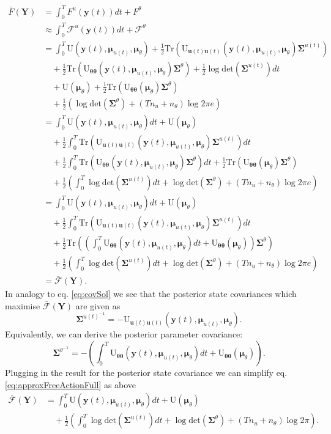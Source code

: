 \documentclass[a4paper,10pt]{article}
\newcommand{\bs}[1]{\mathbf{#1}}					%
\newcommand{\bgs}[1]{\boldsymbol{#1}}				%
\newcommand{\eq}[1]{\begin{equation} #1 \end{equation}}%
\newcommand{\trace}[1]{\mathrm{Tr}\left(#1\right)}					%
\renewcommand{\ss}{u}         %
\newcommand{\so}{y}         %
\renewcommand{\sp}{\theta}    %
\newcommand{\ps}{\bs{\ss}}    %
\newcommand{\po}{\bs{\so}}    %
\newcommand{\pp}{\bgs{\sp}} %
\newcommand{\Po}{\bs{Y}}    %
\newcommand{\U}{\mathrm{U}}			%
\newcommand{\F}{\mathcal{F}}				%
\newcommand{\Fa}{\bar{\mathcal{F}}}		%
\newcommand{\Cov}{\bgs{\Sigma}}			%
\renewcommand{\det}[1]{\mathrm{det}(#1)}	%
\begin{document}
\begin{align}
    \bar{F}(\Po) &= \int_0^T F^\ss(\po(t)) dt + F^\sp\\
    &\approx \int_0^T \F^\ss(\po(t)) dt + \F^\sp\\
    &= \int_0^T  \U(\po(t),\bgs{\mu}_{\ss(t)},\bgs{\mu}_\sp) + \frac{1}{2}\trace{\U_{\ps(t)\ps(t)}(\po(t),\bgs{\mu}_{\ss(t)},\bgs{\mu}_\sp)\Cov^{\ss(t)}}\nonumber\\
    &\quad + \frac{1}{2}\trace{\U_{\pp\pp}(\po(t),\bgs{\mu}_{\ss(t)},\bgs{\mu}_\sp)\Cov^\sp} + \frac{1}{2}\log \det{\Cov^{\ss(t)}} dt \nonumber\\ 
    &\quad + \U(\bgs{\mu}_\sp) + \frac{1}{2}\trace{\U_{\pp\pp}(\bgs{\mu}_\sp)\Cov^\sp}\nonumber\\
    &\quad + \frac{1}{2} \left(\log \det{\Cov^\sp} + (Tn_\ss + n_{\sp}) \log 2\pi e\right)\\
    &= \int_0^T  \U(\po(t),\bgs{\mu}_{\ss(t)},\bgs{\mu}_\sp)dt + \U(\bgs{\mu}_\sp) \nonumber\\
    &\quad + \frac{1}{2}\int_0^T \trace{\U_{\ps(t)\ps(t)}(\po(t),\bgs{\mu}_{\ss(t)},\bgs{\mu}_\sp)\Cov^{\ss(t)}}dt\nonumber\\
    &\quad + \frac{1}{2}\int_0^T \trace{\U_{\pp\pp}(\po(t),\bgs{\mu}_{\ss(t)},\bgs{\mu}_\sp)\Cov^\sp} dt + \frac{1}{2}\trace{\U_{\pp\pp}(\bgs{\mu}_\sp)\Cov^\sp}\nonumber\\
    &\quad + \frac{1}{2} \left(\int_0^T \log \det{\Cov^{\ss(t)}} dt + \log \det{\Cov^\sp} + (Tn_\ss + n_{\sp}) \log 2\pi e\right)\\
    &= \label{eq:approxFreeActionFull} \int_0^T  \U(\po(t),\bgs{\mu}_{\ss(t)},\bgs{\mu}_\sp)dt + \U(\bgs{\mu}_\sp) \nonumber\\
    &\quad + \frac{1}{2}\int_0^T \trace{\U_{\ps(t)\ps(t)}(\po(t),\bgs{\mu}_{\ss(t)},\bgs{\mu}_\sp)\Cov^{\ss(t)}}dt\nonumber\\
    &\quad + \frac{1}{2} \trace{\left(\int_0^T \U_{\pp\pp}(\po(t),\bgs{\mu}_{\ss(t)},\bgs{\mu}_\sp)dt + \U_{\pp\pp}(\bgs{\mu}_\sp)\right)\Cov^\sp}\nonumber\\
    &\quad + \frac{1}{2} \left(\int_0^T \log \det{\Cov^{\ss(t)}} dt + \log \det{\Cov^\sp} + (Tn_\ss + n_{\sp}) \log 2\pi e\right)\\
    &= \Fa(\Po).
\end{align}
In analogy to eq. \eqref{eq:covSol} we see that the posterior state covariances which maximise $\Fa(\Po)$ are given as
\eq{\label{eq:postCovStates}
    \Cov^{\ss(t)^{-1}} = -\U_{\ps(t)\ps(t)}(\po(t),\bgs{\mu}_{\ss(t)},\bgs{\mu}_\sp).
}
Equivalently, we can derive the posterior parameter covariance:
\eq{\label{eq:postCovParam}
    \Cov^{\sp^{-1}} = -\left(\int_0^T \U_{\pp\pp}(\po(t),\bgs{\mu}_{\ss(t)},\bgs{\mu}_\sp)dt + \U_{\pp\pp}(\bgs{\mu}_\sp)\right).
}
Plugging in the result for the posterior state covariance we can simplify eq. \eqref{eq:approxFreeActionFull} as above
\begin{align}
    \Fa(\Po) &= \label{eq:approxFreeAction} \int_0^T  \U(\po(t),\bgs{\mu}_{\ss(t)},\bgs{\mu}_\sp)dt +  \U(\bgs{\mu}_\sp) \nonumber\\
    &\quad + \frac{1}{2} \left(\int_0^T \log \det{\Cov^{\ss(t)}} dt + \log \det{\Cov^\sp} + (Tn_\ss + n_{\sp}) \log 2\pi\right).
\end{align}
\end{document}
